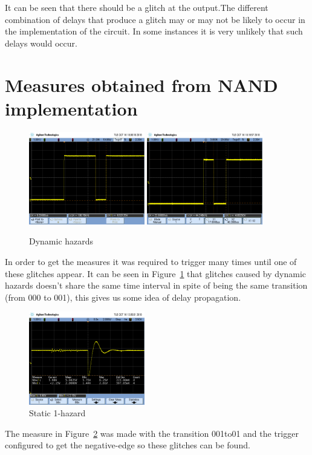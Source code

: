 It can be seen that there should be a glitch at the output.The different combination of delays that produce a glitch may or may not be likely 
to occur in the implementation of the circuit. In some instances it is very 
unlikely that such delays would occur.


\section*{Measures obtained from NAND implementation}
\begin{figure}[H] 
\begin{center}
\includegraphics[width=0.45\textwidth]{data/000to001.png}
\includegraphics[width=0.45\textwidth]{data/000to001_11.png}
\end{center}
\caption{Dynamic hazards}
\label{fig:measure_dynamic}
\end{figure} 
In order to get the measures it was required to trigger many times until one of these 
glitches appear. It can be seen in Figure~\ref{fig:measure_dynamic} that glitches caused by dynamic hazards doesn't share the same time interval in spite of being the same transition
(from 000 to 001), this gives us some idea of delay propagation. 

\begin{figure}[H] 
\begin{center}
\includegraphics[width=0.45\textwidth]{data/001to011.png}
\end{center}
\caption{Static 1-hazard}
\label{fig:measure_static}
\end{figure} 
The measure in Figure~\ref{fig:measure_static} was made with the transition 001to01 and the
 trigger configured to get the negative-edge so these glitches can be found.


